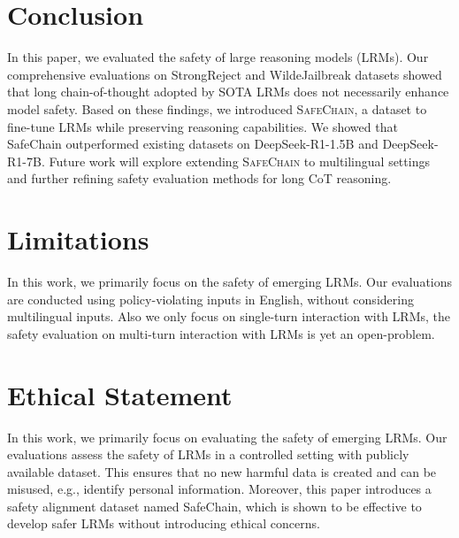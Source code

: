 \section{Conclusion}
In this paper, we evaluated the safety of large reasoning models (LRMs).
Our comprehensive evaluations on StrongReject and WildeJailbreak datasets showed that long chain-of-thought adopted by SOTA LRMs does not necessarily enhance model safety.
Based on these findings, we introduced \textsc{SafeChain}, a dataset to fine-tune LRMs while preserving reasoning capabilities.
We showed that SafeChain outperformed existing datasets on DeepSeek-R1-1.5B and DeepSeek-R1-7B.
Future work will explore extending \textsc{SafeChain} to multilingual settings and further refining safety evaluation methods for long CoT reasoning.

\section*{Limitations}
In this work, we primarily focus on the safety of emerging LRMs. 
Our evaluations are conducted using policy-violating inputs in English, without considering multilingual inputs. Also we only focus on single-turn interaction with LRMs, the safety evaluation on multi-turn interaction with LRMs is yet an open-problem.

\section*{Ethical Statement}

In this work, we primarily focus on evaluating the safety of emerging LRMs. 
Our evaluations assess the safety of LRMs in a controlled setting with publicly available dataset.
This ensures that no new harmful data is created and can be misused, e.g., identify personal information.
Moreover, this paper introduces a safety alignment dataset named SafeChain, which is shown to be effective to develop safer LRMs without introducing ethical concerns.
